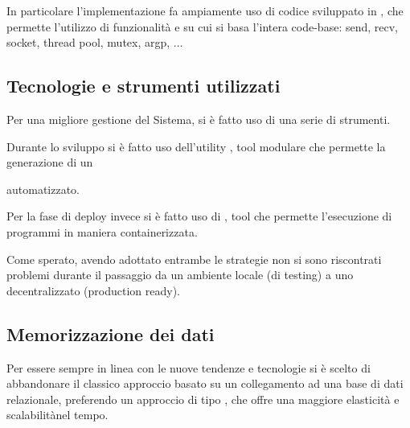         In particolare l'implementazione fa ampiamente uso di codice sviluppato in , che permette l'utilizzo di funzionalità
        e \footnotemark su cui si basa l'intera code-base: send, recv, socket, thread pool, mutex, argp, $\dots$

    \subsection{Tecnologie e strumenti utilizzati}
      Per una migliore gestione del Sistema, si è fatto uso di una serie di strumenti.

      Durante lo sviluppo si è fatto uso dell'utility \footnotemark {} , tool modulare che permette la generazione di un \footnotemark

      automatizzato.


      Per la fase di deploy invece si è fatto uso di , tool che permette l'esecuzione di programmi in maniera containerizzata.

      Come sperato, avendo adottato entrambe le strategie non si sono riscontrati problemi durante il passaggio da un ambiente locale (di testing) a uno decentralizzato (production ready).
    \subsection{Memorizzazione dei dati}
    Per essere sempre in linea con le nuove tendenze e tecnologie si è scelto di abbandonare il classico approccio basato su un collegamento ad una base di dati relazionale, preferendo un approccio di tipo \footnotemark ,  che offre una maggiore elasticità \footnotemark {}
    e scalabilità\footnotemark nel tempo.

    \newpage
